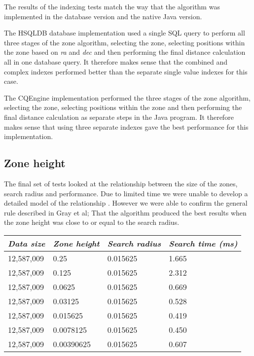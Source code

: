 \documentclass{article}
\newcommand{\hsqldb} {HSQLDB\xspace}
\newcommand{\cqengine} {CQEngine\xspace}
\begin{document}
The results of the indexing tests match the way that the algorithm was implemented in the database version and the native Java version.

The \hsqldb database implementation used a single SQL query to perform all three stages of the zone algorithm, selecting the zone, selecting positions within the zone based on \textit{ra} and \textit{dec} and then performing the final distance calculation all in one database query. It therefore makes sense that the combined and complex indexes performed better than the separate single value indexes for this case.

The \cqengine implementation performed the three stages of the zone algorithm, selecting the zone, selecting positions within the zone and then performing the final distance calculation as separate steps in the Java program.  It therefore makes sense that using three separate indexes gave the best performance for this implementation.

\subsection{Zone height}
\label{zone-height}

The final set of tests looked at the relationship between the size of the zones, search radius and performance. Due to limited time we were unable to develop a detailed model of the relationship . However we were able to confirm the general rule described in Gray et al; That the algorithm produced the best results when the zone height was close to or equal to the search radius. 

\begin{table}[h]
\centering
\begin{tabular}{|l|l|l|l|}
\hline
\textit{Data size} & \textit{Zone height} & \textit{Search radius} & \textit{Search time (ms)} \\ \hline
12,587,009 & 0.25       & 0.015625 & 1.665 \\ \hline
12,587,009 & 0.125      & 0.015625 & 2.312 \\ \hline
12,587,009 & 0.0625     & 0.015625 & 0.669 \\ \hline
12,587,009 & 0.03125    & 0.015625 & 0.528 \\ \hline
12,587,009 & 0.015625   & 0.015625 & 0.419 \\ \hline
12,587,009 & 0.0078125  & 0.015625 & 0.450 \\ \hline
12,587,009 & 0.00390625 & 0.015625 & 0.607 \\ \hline
\end{tabular}
\end{table}
\end{document}
